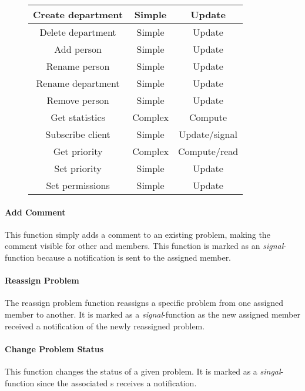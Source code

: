 \begin{figure}[h]
\begin{center}
\begin{tabular}{|c|c|c|}
Create department & Simple & Update \\ \hline%
Delete department & Simple & Update \\ \hline%
Add person & Simple & Update \\ \hline%
Rename person & Simple & Update \\ \hline%
Rename department & Simple & Update \\ \hline%
Remove person & Simple & Update \\ \hline%
Get statistics & Complex & Compute \\ \hline%
Subscribe client & Simple & Update/signal \\ \hline%
Get priority & Complex & Compute/read \\ \hline%
Set priority & Simple & Update \\ \hline%
Set permissions & Simple & Update \\ \hline%

\end{tabular}
\end{center}
\label{tab:functionlist}
\end{figure}


\paragraph{Add Comment} This function simply adds a comment to an existing problem, making the comment visible for other \client{} and \astaff[] members. This function is marked as an \textit{signal}-function because a notification is sent to the assigned \astaff[] member.

\paragraph{Reassign Problem} The reassign problem function reassigns a specific problem from one assigned \astaff[] member to another. It is marked as a \textit{signal}-function as the new assigned \astaff[] member received a notification of the newly reassigned problem. 

\paragraph{Change Problem Status} This function changes the status of a given problem. It is marked as a \textit{singal}-function since the associated \client s receives a notification. 

